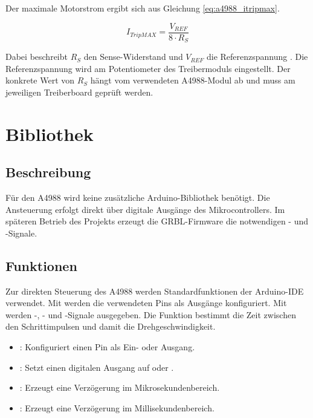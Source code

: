 Der maximale Motorstrom ergibt sich aus Gleichung \ref{eq:a4988_itripmax}.

\begin{equation}
	I_{TripMAX} = \frac{V_{REF}}{8 \cdot R_S}
	\label{eq:a4988_itripmax}
\end{equation}

Dabei beschreibt \(R_S\) den Sense-Widerstand und \(V_{REF}\) die Referenzspannung \cite{Allegro:A4988}. 
Die Referenzspannung wird am Potentiometer des Treibermoduls eingestellt. 
Der konkrete Wert von \(R_S\) hängt vom verwendeten A4988-Modul ab und muss am jeweiligen Treiberboard geprüft werden.

\section{Bibliothek}

\subsection{Beschreibung}

Für den A4988 wird keine zusätzliche Arduino-Bibliothek benötigt. 
Die Ansteuerung erfolgt direkt über digitale Ausgänge des Mikrocontrollers. 
Im späteren Betrieb des Projekts erzeugt die GRBL-Firmware die notwendigen - und -Signale.

\subsection{Funktionen}

Zur direkten Steuerung des A4988 werden Standardfunktionen der Arduino-IDE verwendet. 
Mit  werden die verwendeten Pins als Ausgänge konfiguriert. 
Mit  werden -, - und -Signale ausgegeben. 
Die Funktion  bestimmt die Zeit zwischen den Schrittimpulsen und damit die Drehgeschwindigkeit.

\begin{itemize}
	\item {}: Konfiguriert einen Pin als Ein- oder Ausgang.
	\item {}: Setzt einen digitalen Ausgang auf  oder .
	\item {}: Erzeugt eine Verzögerung im Mikrosekundenbereich.
	\item {}: Erzeugt eine Verzögerung im Millisekundenbereich.
\end{itemize}

